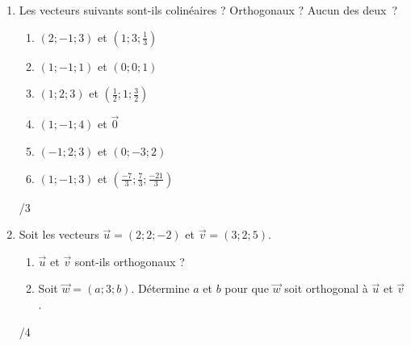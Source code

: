 \begin{enumerate}
		\item 
			\begin{minipage}[t]{.9\textwidth}
				Les vecteurs suivants sont-ils colinéaires ? Orthogonaux ? Aucun des deux~?
				\begin{enumerate}
					\item $\left(2; -1; 3\right)$ et $\left(1; 3; \frac{1}{3}\right)$
					\item $\left(1; -1; 1\right)$ et $\left(0; 0; 1\right)$
					\item $\left(1; 2; 3\right)$ et $\left(\frac{1}{2}; 1; \frac{3}{2}\right)$
					\item $\left(1; -1; 4\right)$ et $\vec{0}$
					\item $\left(-1; 2; 3\right)$ et $\left(0; -3; 2\right)$
					\item $\left(1; -1; 3\right)$ et $\left(\frac{-7}{3}; \frac{7}{3}; \frac{-21}{3}\right)$
				\end{enumerate}
			\end{minipage}%
			\begin{minipage}{.1\textwidth}
				\begin{flushright}
					{\large /3}
				\end{flushright}
			\end{minipage}
			\vspace{1em}
			
		\item 
			\begin{minipage}[t]{.9\textwidth}
				Soit les vecteurs $\vec{u} = \left(2; 2; -2\right)$ et $\vec{v} = \left(3; 2; 5\right)$.
				\begin{enumerate}
					\item $\vec{u}$ et $\vec{v}$ sont-ils orthogonaux ?
					\item Soit $\vec{w} = \left(a; 3; b\right)$. Détermine $a$ et $b$ pour que $\vec{w}$ soit orthogonal à $\vec{u}$ et $\vec{v}$.
				\end{enumerate}
			\end{minipage}%
			\begin{minipage}{.1\textwidth}
				\begin{flushright}
					{\large /4}
				\end{flushright}
			\end{minipage}
			\vspace{1em}
			

\end{enumerate}
